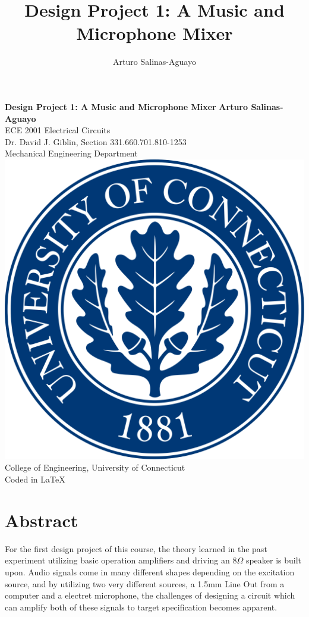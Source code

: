 \documentclass[12pt]{article}
\author{Arturo Salinas-Aguayo}
\title{Design Project 1: A Music and Microphone Mixer}
\begin{document}
\newcommand{\closure}[2][3]{%
	{}\mkern#1mu\overline{\mkern-#1mu#2}}
\newcommand\ncoverline[1]{\mkern1mu\overline{\mkern-1mu#1\mkern-1mu}\mkern1mu}
\begin{titlepage}
	\centering
	\vspace*{3cm}
	\huge\textbf{Design Project 1: A Music and Microphone Mixer}
	\vspace{5cm}
	\Large\textbf{Arturo Salinas-Aguayo}\\
	\normalsize
	ECE 2001 Electrical Circuits\\
	Dr. David J. Giblin, Section 331.660.701.810-1253\\
	Mechanical Engineering Department
	\vfill
	\includegraphics[scale=0.1]{uconnlogo}\\
	College of Engineering, University of Connecticut\\
	\scriptsize{Coded in \LaTeX}
	\vspace*{1cm}
\end{titlepage}
\tableofcontents
\newpage
\section{Abstract}
For the first design project of this course, the theory learned in the past
experiment utilizing basic operation amplifiers and driving an $8\Omega$ speaker
is built upon. Audio signals come in many different shapes depending on the
excitation source, and by utilizing two very different sources, a 1.5mm Line Out
from a computer and a electret microphone, the challenges of designing a circuit
which can amplify both of these signals to target specification becomes
apparent.
\end{document}
